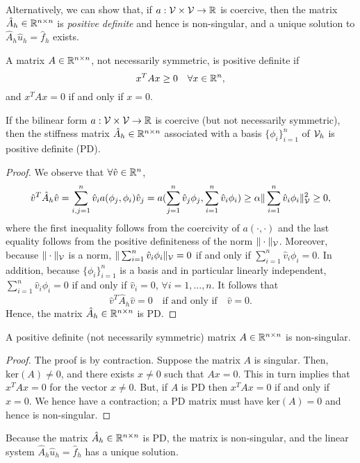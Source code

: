 Alternatively, we can show that, if $a:\mathcal{V} \times \mathcal{V} \to \mathbb{R}$ is coercive, then the matrix $\hat A_h \in \mathbb{R}^{n \times n}$ is \emph{positive definite} and hence is non-singular, and a unique solution to $\hat A_h \hat u_h = \hat f_h$ exists.
\begin{definition}
  A matrix $A \in \mathbb{R}^{n \times n}$, not necessarily symmetric, is positive definite if
  \begin{equation*}
    x^T A x \geq 0 \quad \forall x \in \mathbb{R}^n,
  \end{equation*}
  and $x^T A x = 0$ if and only if $x = 0$.
\end{definition}
\begin{proposition}
  \label{prop:fe_form_Ah_pd}
  If the bilinear form $a: \mathcal{V} \times \mathcal{V} \to \mathbb{R}$ is coercive (but not necessarily symmetric), then the stiffness matrix $\hat A_h \in \mathbb{R}^{n \times n}$ associated with a basis $\{ \phi_i \}_{i=1}^n$ of $\mathcal{V}_h$ is positive definite (PD).
  \begin{proof}
  We observe that $\forall \hat v \in \mathbb{R}^n$, 
\begin{equation*}
  \hat v^T \hat A_{h} \hat v
  =
  \sum_{i,j = 1}^n \hat v_i a(\phi_j, \phi_i) \hat v_j 
  = a(\sum_{j=1}^n \hat v_j \phi_j, \sum_{i=1}^n \hat v_i \phi_i)
  \geq \alpha \| \sum_{i=1}^n \hat v_i \phi_i \|^2_{\mathcal{V}} \geq 0,
\end{equation*}
where the first inequality follows from the coercivity of $a(\cdot,\cdot)$ and the last equality follows from the positive definiteness of the norm $\| \cdot \|_{\mathcal{V}}$. Moreover, because $\| \cdot \|_{\mathcal{V}}$ is a norm, $\| \sum_{i=1}^n \hat v_i \phi_i \|_{\mathcal{V}} = 0$ if and only if $\sum_{i=1}^n \hat v_i \phi_i = 0$.  In addition, because $\{\phi_i\}_{i=1}^n$ is a basis and in particular linearly independent, $\sum_{i=1}^n \hat v_i \phi_i = 0$ if and only if $\hat v_i = 0$, $\forall i = 1,\dots,n$. It follows that
\begin{equation*}
  \hat v^T \hat A_h \hat v = 0 \quad \text{if and only if} \quad \hat v = 0.
\end{equation*}
Hence, the matrix $\hat A_h \in \mathbb{R}^{n \times n}$ is PD.
  \end{proof}
\end{proposition}
\begin{proposition}
  A positive definite (not necessarily symmetric) matrix $A \in \mathbb{R}^{n \times n}$ is non-singular.
  \begin{proof}
    The proof is by contraction.  Suppose the matrix $A$ is singular.  Then, $\text{ker}(A) \neq 0$, and there exists $x \neq 0$ such that $Ax = 0$.  This in turn implies that $x^T A x = 0$ for the vector $x \neq 0$.  But, if $A$ is PD then $x^T A x = 0$ if and only if $x = 0$.  We hence have a contraction; a PD matrix must have $\text{ker}(A) = 0$ and hence is non-singular.
  \end{proof}
\end{proposition}
\begin{remark}
  Because the matrix $\hat A_h \in \mathbb{R}^{n \times n}$ is PD, the matrix is non-singular, and the linear system $\hat A_h \hat u_h = \hat f_h$ has a unique solution.
\end{remark}


